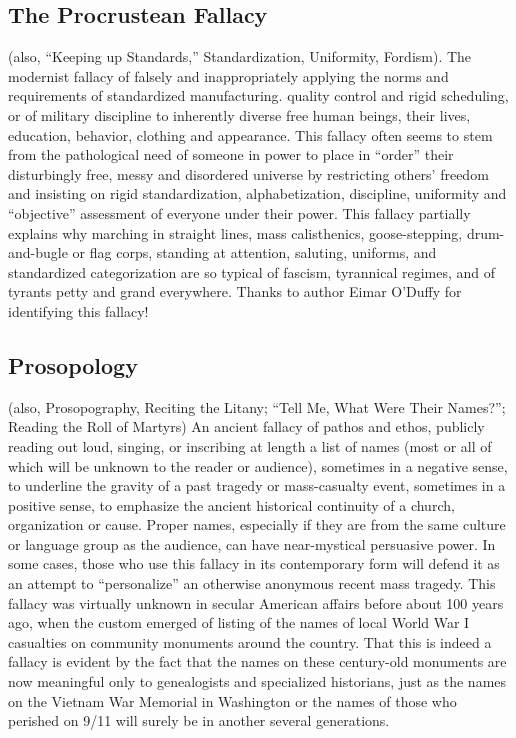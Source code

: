\documentclass[10pt,a4paper,british]{article}
\begin{document}
\begin{multicols}{2}
	\subsection{The Procrustean Fallacy} (also, ``Keeping up Standards,''
	Standardization, Uniformity, Fordism).  The modernist fallacy of falsely
	and inappropriately applying the norms and requirements of standardized
	manufacturing. quality control and rigid scheduling, or of military
	discipline to inherently diverse free human beings, their lives, education,
	behavior, clothing and appearance. This fallacy often seems to stem from
	the pathological need of someone in power to place in ``order'' their
	disturbingly free, messy and disordered universe by restricting others'
	freedom and insisting on rigid standardization, alphabetization,
	discipline, uniformity and ``objective'' assessment of everyone under their
	power. This fallacy partially explains why marching in straight lines, mass
	calisthenics, goose{-}stepping, drum{-}and{-}bugle or flag corps, standing
	at attention, saluting, uniforms, and standardized categorization are so
	typical of fascism, tyrannical regimes, and of tyrants petty and grand
	everywhere. Thanks to author Eimar O'Duffy for identifying this fallacy!

	\subsection{Prosopology} (also, Prosopography, Reciting the Litany; ``Tell
	Me, What Were Their Names?''; Reading the Roll of Martyrs) An ancient
	fallacy of pathos and ethos, publicly reading out loud, singing, or
	inscribing at length a list of names (most or all of which will be unknown
	to the reader or audience), sometimes in a negative sense, to underline the
	gravity of a past tragedy or mass{-}casualty event, sometimes in a positive
	sense, to emphasize the ancient historical continuity of a church,
	organization or cause. Proper names, especially if they are from the same
	culture or language group as the audience, can have near{-}mystical
	persuasive power.  In some cases, those who use this fallacy in its
	contemporary form will defend it as an attempt to ``personalize'' an
	otherwise anonymous recent mass tragedy. This fallacy was virtually unknown
	in secular American affairs before about 100 years ago, when the custom
	emerged of listing of the names of local World War I casualties on
	community monuments around the country. That this is indeed a fallacy is
	evident by the fact that the names on these century{-}old monuments are now
	meaningful only to genealogists and specialized historians, just as the
	names on the Vietnam War Memorial in Washington or the names of those who
	perished on 9/11 will surely be in another several generations.


\end{multicols}
\end{document}
